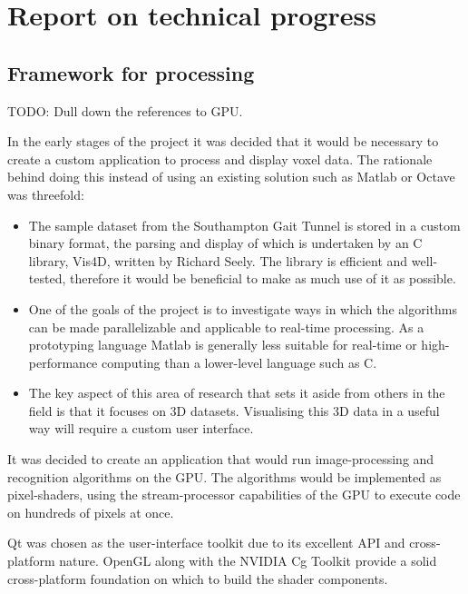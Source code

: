 \section{Report on technical progress}

\subsection{Framework for processing}

TODO: Dull down the references to GPU.

In the early stages of the project it was decided that it would be necessary to create a custom application to process and display voxel data.
The rationale behind doing this instead of using an existing solution such as Matlab or Octave was threefold:

\begin{itemize}
	\item The sample dataset from the Southampton Gait Tunnel is stored in a custom binary format, the parsing and display of which is
		undertaken by an C library, Vis4D, written by Richard Seely.
		The library is efficient and well-tested, therefore it would be beneficial to make as much use of it as possible.
	\item One of the goals of the project is to investigate ways in which the algorithms can be made parallelizable and applicable to real-time processing.
		As a prototyping language Matlab is generally less suitable for real-time or high-performance computing than a lower-level language such as C.
	\item The key aspect of this area of research that sets it aside from others in the field is that it focuses on 3D datasets.
		Visualising this 3D data in a useful way will require a custom user interface.
\end{itemize}

It was decided to create an application that would run image-processing and recognition algorithms on the GPU.
The algorithms would be implemented as pixel-shaders, using the stream-processor capabilities of the GPU to execute code on hundreds of pixels at once.

Qt \cite{Qt} was chosen as the user-interface toolkit due to its excellent API and cross-platform nature.
OpenGL along with the NVIDIA Cg Toolkit \cite{CgToolkit} provide a solid cross-platform foundation on which to build the shader components.

